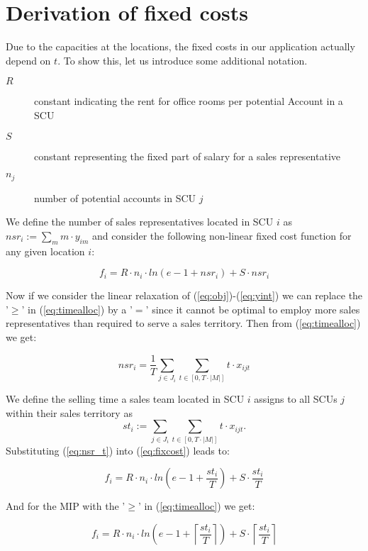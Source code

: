 \documentclass{article}
\begin{document}
\section{Derivation of fixed costs}

Due to the capacities at the locations, the fixed costs in our application actually depend on $t$. To show this, let us introduce some additional notation. 

\begin{description}
\item[$R$] constant indicating the rent for office rooms per potential Account in a SCU
\item[$S$] constant representing the fixed part of salary for a sales representative
\item[$n_j$] number of potential accounts in SCU $j$
\end{description}

We define the number of sales representatives located in SCU $i$ as $nsr_i:=  \sum_{m} m \cdot  y_{im} $ and consider the following non-linear fixed cost function for any given location $i$:

\begin{equation}
    f_{i} = R \cdot n_i \cdot ln(e - 1 + nsr_i) + S \cdot nsr_i \label{eq:fixcost}
\end{equation}

Now if we consider the linear relaxation of (\ref{eq:obj})-(\ref{eq:yint}) we can replace the '$\geq$' in (\ref{eq:timealloc}) by a '$=$' since it cannot be optimal to employ more sales representatives than required to serve a sales territory. Then from (\ref{eq:timealloc}) we get:

\begin{equation}
    nsr_i = \frac{1}{T} \sum_{ j \in J_i} \sum_{t\in [0,T \cdot |M|]} t \cdot x_{ijt} \label{eq:nsr_t}
\end{equation}

We define the selling time a sales team located in SCU $i$ assigns to all SCUs $j$ within their sales territory as
\begin{equation}
    st_{i} :=  \sum_{ j \in J_i} \sum_{t\in [0,T \cdot |M|]} t \cdot x_{ijt}.
\end{equation}
Substituting (\ref{eq:nsr_t}) into (\ref{eq:fixcost}) leads to:

\begin{equation}
    f_{i} = R \cdot n_i \cdot ln(e - 1 + \frac{st_i}{T} ) + S \cdot \frac{st_i}{T}
\end{equation}

And for the MIP with the '$\geq$' in (\ref{eq:timealloc}) we get:

\begin{equation}
    f_{i} = R \cdot n_i \cdot ln(e - 1 + \left\lceil \frac{st_i}{T}\right\rceil) + S \cdot \left\lceil \frac{st_i}{T}\right\rceil
\end{equation}
\end{document}
